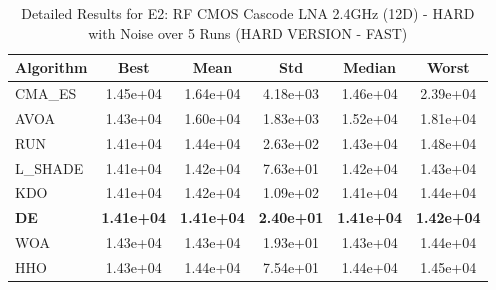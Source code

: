 \begin{table}[htbp]
\centering
\caption{Detailed Results for E2: RF CMOS Cascode LNA 2.4GHz (12D) - HARD with Noise over 5 Runs (HARD VERSION - FAST)}
\label{tab:P2_detailed}
\small
\begin{tabular}{lccccc}
\toprule
\textbf{Algorithm} & \textbf{Best} & \textbf{Mean} & \textbf{Std} & \textbf{Median} & \textbf{Worst} \\
\midrule
CMA_ES & 1.45e+04 & 1.64e+04 & 4.18e+03 & 1.46e+04 & 2.39e+04 \\
AVOA & 1.43e+04 & 1.60e+04 & 1.83e+03 & 1.52e+04 & 1.81e+04 \\
RUN & 1.41e+04 & 1.44e+04 & 2.63e+02 & 1.43e+04 & 1.48e+04 \\
L_SHADE & 1.41e+04 & 1.42e+04 & 7.63e+01 & 1.42e+04 & 1.43e+04 \\
KDO & 1.41e+04 & 1.42e+04 & 1.09e+02 & 1.41e+04 & 1.44e+04 \\
\textbf{DE} & \textbf{1.41e+04} & \textbf{1.41e+04} & \textbf{2.40e+01} & \textbf{1.41e+04} & \textbf{1.42e+04} \\
WOA & 1.43e+04 & 1.43e+04 & 1.93e+01 & 1.43e+04 & 1.44e+04 \\
HHO & 1.43e+04 & 1.44e+04 & 7.54e+01 & 1.44e+04 & 1.45e+04 \\
\bottomrule
\end{tabular}
\end{table}
